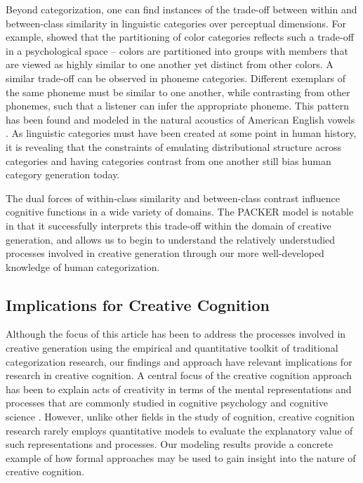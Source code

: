 \documentclass[12pt]{article}
\begin{document}
\begin{flushleft}
Beyond categorization, one can find instances of the trade-off between within and between-class similarity in linguistic categories over perceptual dimensions. For example, \cite{regier2007} showed that the partitioning of color categories reflects such a trade-off in a psychological space -- colors are partitioned into groups with members that are viewed as highly similar to one another yet distinct from other colors. A similar trade-off can be observed in phoneme categories. Different exemplars of the same phoneme must be similar to one another, while contrasting from other phonemes, such that a listener can infer the appropriate phoneme. This pattern has been found and modeled in the natural acoustics of American English vowels \citep{feldman2013,hillenbrand1995}. As linguistic categories must have been created at some point in human history, it is revealing that the constraints of emulating distributional structure across categories and having categories contrast from one another still bias human category generation today.

The dual forces of within-class similarity and between-class contrast influence cognitive functions in a wide variety of domains. The PACKER model is notable in that it successfully interprets this trade-off within the domain of creative generation, and allows us to begin to understand the relatively understudied processes involved in creative generation through our more well-developed knowledge of human categorization.


\subsection{Implications for Creative Cognition}

Although the focus of this article has been to address the processes involved in creative generation using the empirical and quantitative toolkit of traditional categorization research, our findings and approach have relevant implications for research in creative cognition. A central focus of the creative cognition approach has been to explain acts of creativity in terms of the mental representations and processes that are commonly studied in cognitive psychology and cognitive science \citep{finke1992creative,smith1995creative}. However, unlike other fields in the study of cognition, creative cognition research rarely employs quantitative models to evaluate the explanatory value of such representations and processes. Our modeling results provide a concrete example of how formal approaches may be used to gain insight into the nature of creative cognition.


\end{flushleft}
\end{document}
